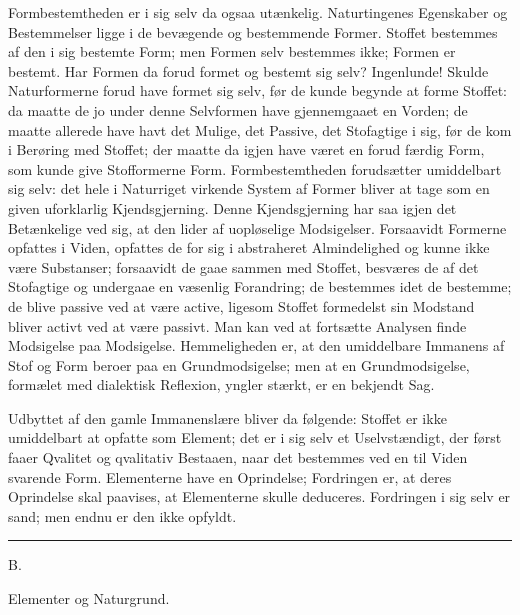 \documentclass[12pt,a4paper]{book}
\newcommand{\afdeling}[2]{%
  \par\vspace{1.3\baselineskip}%
  {\centering #1\par\vspace{0.2\baselineskip}\normalsize #2\par}%
  \addcontentsline{toc}{section}{#1 #2}%
  \vspace{0.8\baselineskip}\par\nointerlineskip}
\newcommand{\streg}{\begin{center}\rule{2cm}{0.4pt}\end{center}}
\begin{document}
Formbestemtheden er i sig selv da ogsaa utænkelig. Naturtingenes Egenskaber og
Bestemmelser ligge i de bevægende og bestemmende Former. Stoffet bestemmes af
den i sig bestemte Form; men Formen selv bestemmes ikke; Formen er bestemt.
Har Formen da forud formet og bestemt sig selv? Ingenlunde! Skulde
Naturformerne forud have formet sig selv, før de kunde begynde at forme
Stoffet: da maatte de jo under denne Selvformen have gjennemgaaet en Vorden;
de maatte allerede have havt det Mulige, det Passive, det Stofagtige i sig,
før de kom i Berøring med Stoffet; der maatte da igjen have været en forud
færdig Form, som kunde give Stofformerne Form. Formbestemtheden forudsætter
umiddelbart sig selv: det hele i Naturriget virkende System af Former bliver
at tage som en given uforklarlig Kjendsgjerning. Denne Kjendsgjerning har saa
igjen det Betænkelige ved sig, at den lider af uopløselige Modsigelser.
Forsaavidt Formerne opfattes i Viden, opfattes de for sig i abstraheret
Almindelighed og kunne ikke være Substanser; forsaavidt de gaae sammen med
Stoffet, besværes de af det Stofagtige og undergaae en væsenlig Forandring; de
bestemmes idet de bestemme; de blive passive ved at være active, ligesom
Stoffet formedelst sin Modstand bliver activt ved at være passivt. Man kan ved
at fortsætte Analysen finde Modsigelse paa Modsigelse. Hemmeligheden er, at
den umiddelbare Immanens af Stof og Form beroer paa en Grundmodsigelse; men at
en Grundmodsigelse, formælet med dialektisk Reflexion, yngler stærkt, er en
bekjendt Sag.

Udbyttet af den gamle Immanenslære bliver da følgende: Stoffet er ikke
umiddelbart at opfatte som Element;
det er i sig selv et Uselvstændigt, der først faaer Qvalitet og qvalitativ
Bestaaen, naar det bestemmes ved en til Viden svarende Form. Elementerne
have en Oprindelse; Fordringen er, at deres Oprindelse skal paavises, at
Elementerne skulle deduceres. Fordringen i sig selv er sand; men endnu er
den ikke opfyldt.

\streg

\afdeling{B.}{Elementer og Naturgrund.}
\end{document}
